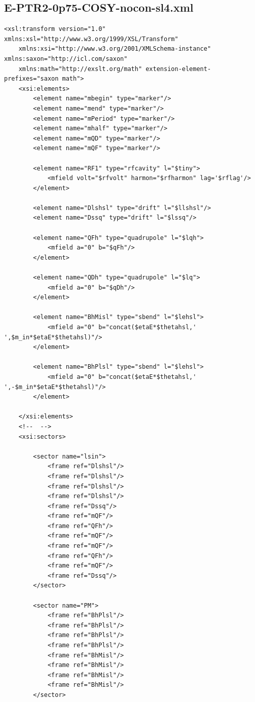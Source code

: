 \documentclass[]{article}
\begin{document}
\subsection{E-PTR2-0p75-COSY-nocon-sl4.xml}
\begin{verbatim}
<xsl:transform version="1.0" xmlns:xsl="http://www.w3.org/1999/XSL/Transform"
    xmlns:xsi="http://www.w3.org/2001/XMLSchema-instance" xmlns:saxon="http://icl.com/saxon"
    xmlns:math="http://exslt.org/math" extension-element-prefixes="saxon math">
    <xsi:elements>
        <element name="mbegin" type="marker"/>
        <element name="mend" type="marker"/>
        <element name="mPeriod" type="marker"/>
        <element name="mhalf" type="marker"/>
        <element name="mQD" type="marker"/>
        <element name="mQF" type="marker"/>

        <element name="RF1" type="rfcavity" l="$tiny">
            <mfield volt="$rfvolt" harmon="$rfharmon" lag='$rflag'/>
        </element> 
        
        <element name="Dlshsl" type="drift" l="$llshsl"/>
        <element name="Dssq" type="drift" l="$lssq"/>
         
        <element name="QFh" type="quadrupole" l="$lqh">
            <mfield a="0" b="$qFh"/>
        </element>
        
        <element name="QDh" type="quadrupole" l="$lq">
            <mfield a="0" b="$qDh"/>
        </element>
        
        <element name="BhMisl" type="sbend" l="$lehsl">
            <mfield a="0" b="concat($etaE*$thetahsl,' ',$m_in*$etaE*$thetahsl)"/>
        </element>

        <element name="BhPlsl" type="sbend" l="$lehsl">
            <mfield a="0" b="concat($etaE*$thetahsl,' ',-$m_in*$etaE*$thetahsl)"/>   
        </element>
                
    </xsi:elements>
    <!--  -->
    <xsi:sectors>

        <sector name="lsin">
            <frame ref="Dlshsl"/>
            <frame ref="Dlshsl"/>
            <frame ref="Dlshsl"/>
            <frame ref="Dlshsl"/>
            <frame ref="Dssq"/>
            <frame ref="mQF"/>
            <frame ref="QFh"/>
            <frame ref="mQF"/>
            <frame ref="mQF"/>
            <frame ref="QFh"/>
            <frame ref="mQF"/>
            <frame ref="Dssq"/>
        </sector>

        <sector name="PM">
            <frame ref="BhPlsl"/>
            <frame ref="BhPlsl"/>
            <frame ref="BhPlsl"/>
            <frame ref="BhPlsl"/>
            <frame ref="BhMisl"/>
            <frame ref="BhMisl"/>
            <frame ref="BhMisl"/>
            <frame ref="BhMisl"/>
        </sector>
        

\end{verbatim}
\end{document}
